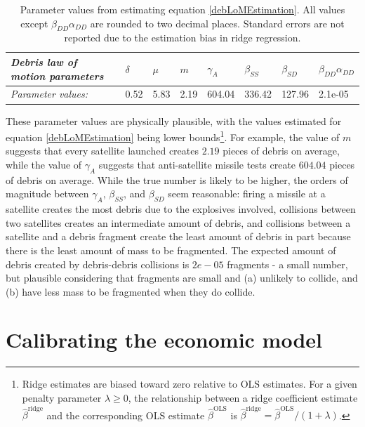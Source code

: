 \documentclass[12pt]{article}
\begin{document}
\begin{table}[H]
	\begin{tabular}{|l|l|l|l|l|l|l|l|}
		\hline
		\textit{Debris law of motion parameters} & \textbf{$\delta$} & \textbf{$\mu$} & \textbf{$m$} & \textbf{$\gamma_A$} & \textbf{$\beta_{SS}$} & \textbf{$\beta_{SD}$} & \textbf{$\beta_{DD}\alpha_{DD}$} \\ \hline
		\textit{Parameter values:}                           & 0.52              & 5.83           & 2.19         & 604.04              & 336.42                & 127.96                & 2.1e-05                          \\ \hline
	\end{tabular}
		\caption{Parameter values from estimating equation \ref{debLoMEstimation}. All values except $\beta_{DD}\alpha_{DD}$ are rounded to two decimal places. Standard errors are not reported due to the estimation bias in ridge regression.}
		\label{debParms}
\end{table}

These parameter values are physically plausible, with the values estimated for equation \ref{debLoMEstimation} being lower bounds\footnote{Ridge estimates are biased toward zero relative to OLS estimates. For a given penalty parameter $\lambda \geq 0$, the relationship between a ridge coefficient estimate $\hat{\beta}^{\text{ridge}}$ and the corresponding OLS estimate $\hat{\beta}^{\text{OLS}}$ is $\hat{\beta}^{\text{ridge}} = \hat{\beta}^{\text{OLS}}/(1+\lambda)$.}. For example, the value of $m$ suggests that every satellite launched creates $2.19$ pieces of debris on average, while the value of $\gamma_A$ suggests that anti-satellite missile tests create $604.04$ pieces of debris on average. While the true number is likely to be higher, the orders of magnitude between $\gamma_A$, $\beta_{SS}$, and $\beta_{SD}$ seem reasonable: firing a missile at a satellite creates the most debris due to the explosives involved, collisions between two satellites creates an intermediate amount of debris, and collisions between a satellite and  a debris fragment create the least amount of debris in part because there is the least amount of mass to be fragmented. The expected amount of debris created by debris-debris collisions is $2e-05$ fragments - a small number, but plausible considering that fragments are small and (a) unlikely to collide, and (b) have less mass to be fragmented when they do collide.

\section{Calibrating the economic model}
\end{document}
